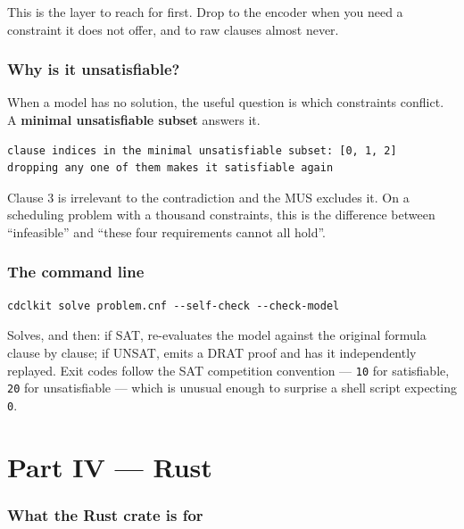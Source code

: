 \documentclass[11pt,a4paper]{article}
\begin{document}
This is the layer to reach for first. Drop to the encoder when you need a
constraint it does not offer, and to raw clauses almost never.

\section{Why is it unsatisfiable?}
\label{sec:mus}

When a model has no solution, the useful question is which constraints
conflict. A \textbf{minimal unsatisfiable subset} answers it.



\begin{lstlisting}[style=out]
clause indices in the minimal unsatisfiable subset: [0, 1, 2]
dropping any one of them makes it satisfiable again
\end{lstlisting}

Clause 3 is irrelevant to the contradiction and the MUS excludes it. On a
scheduling problem with a thousand constraints, this is the difference between
``infeasible'' and ``these four requirements cannot all hold''.

\section{The command line}

\begin{lstlisting}[style=base]
cdclkit solve problem.cnf --self-check --check-model
\end{lstlisting}

Solves, and then: if SAT, re-evaluates the model against the original formula
clause by clause; if UNSAT, emits a DRAT proof and has it independently
replayed. Exit codes follow the SAT competition convention --- \texttt{10} for
satisfiable, \texttt{20} for unsatisfiable --- which is unusual enough to
surprise a shell script expecting \texttt{0}.

\newpage
\part*{Part IV --- Rust}

\section{What the Rust crate is for}
\end{document}
